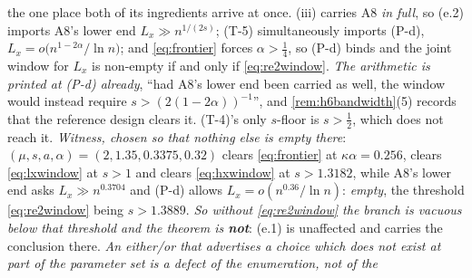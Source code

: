 \begin{remark}
\begin{enumerate}
the one place both of its ingredients arrive at once. \textup{(iii)} carries A8
\emph{in full}, so (e.2) imports A8's lower end $L_x\gg n^{1/(2s)}$; (T-5) simultaneously imports (P-d),
$L_x=o\big(n^{1-2\alpha}/\ln n\big)$; and \eqref{eq:frontier} forces $\alpha>\tfrac14$, so (P-d) binds and
the joint window for $L_x$ is non-empty if and only if \eqref{eq:re2window}. \emph{The arithmetic is
printed at (P-d) already}, ``had A8's lower end been carried as well, the window would instead require
$s>(2(1-2\alpha))^{-1}$'', and \cref{rem:h6bandwidth}\textup{(5)} records that the reference design
clears it. (T-4)'s only $s$-floor is $s>\tfrac12$, which does not reach it.
\emph{Witness, chosen so that nothing else is empty there}: $(\mu,s,a,\alpha)=(2,1.35,0.3375,0.32)$ clears
\eqref{eq:frontier} at $\kappa\alpha=0.256$, clears \eqref{eq:lxwindow} at $s>1$ and clears
\eqref{eq:hxwindow} at $s>1.3182$, while A8's lower end asks $L_x\gg n^{0.3704}$ and (P-d) allows
$L_x=o(n^{0.36}/\ln n)$: \emph{empty}, the threshold \eqref{eq:re2window} being $s>1.3889$.
\emph{So without \eqref{eq:re2window} the branch is vacuous below that threshold and the theorem is
\textbf{not}}: (e.1) is unaffected and carries the conclusion there. \emph{An either/or that advertises a
choice which does not exist at part of the parameter set is a defect of the enumeration, not of the
}
\end{enumerate}
\end{remark}

